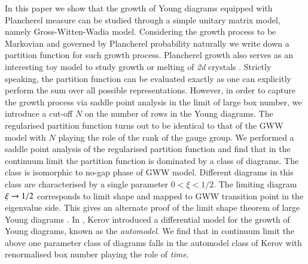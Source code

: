 \documentclass[final,3p,12pt,times]{elsarticle}
\numberwithin{equation}{section}
\begin{document}
In this paper we show that the growth of Young diagrams equipped with Plancherel measure can be studied through a simple unitary matrix model, namely Gross-Witten-Wadia model. Considering the growth process to be Markovian and governed by Plancherel probability naturally we write down a partition function for such growth process. Plancherel growth also serves as an interesting toy model to study growth or melting of \emph{2d} crystals \cite{Eynard:2009nd,Eynard:2008mt}. Strictly speaking, the partition function can be evaluated exactly as one can explicitly perform the sum over all possible representations. However, in order to capture the growth process via saddle point analysis in the limit of large box number, we introduce a cut-off $N$ on the number of rows in the Young diagrams. The regularised partition function turns out to be identical to that of the GWW model with $N$ playing the role of the rank of the gauge group. We performed a saddle point analysis of the regularised partition function and find that in the continuum limit the partition function is dominated by a class of diagrams. The class is isomorphic to no-gap phase of GWW model. Different diagrams in this class are characterised by a single parameter $0<\xi<1/2$. The limiting diagram $\xi \rightarrow 1/2$ corresponds to limit shape and mapped to GWW transition point in the eigenvalue side. This gives an alternate proof of the limit shape theorem of large Young diagrams \cite{LogShe,VerKer77} . In \cite{Kerov1}, Kerov introduced a differential model for the growth of Young diagrams, known as the \emph{automodel}. We find that in continuum limit the above one parameter class of diagrams falls in the automodel class of Kerov with renormalised box number playing the role of \emph{time}.
\end{document}
